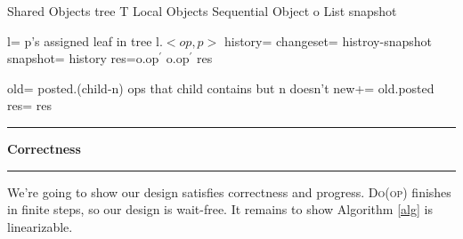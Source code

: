 \documentclass[10pt]{article}
\newcommand\question[1]{\vspace{1.2em}\hrule\textbf{ #1}\vspace{.5em}\hrule}
\newtheorem{lemma}[theorem]{Lemma}
\theoremstyle{definition}
\begin{document}
\begin{algorithm}
\caption{}\label{alg}
\begin{algorithmic}[1]
\begin{multicols}{2}

\Statex Shared Objects
\Statex \hspace{\algorithmicindent}tree T
\Statex Local Objects
\Statex \hspace{\algorithmicindent}Sequential Object o
\Statex \hspace{\algorithmicindent}List snapshot
\Statex

\State l= p's assigned leaf in tree
\State l.$<op, p>$
\State {}
\State history= 
\State changeset= histroy-snapshot
\State snapshot= history
\State res=o.op$^\prime$
\Else
\State o.op$^\prime$
\EndIf
\EndFor
\State \Return res
\EndFunction

\Statex

 \Return
{}
\State {} \EndIf
\State {}
\EndFunction

\Statex

\State old= 
\State posted.(child-n)
\Statex \Comment ops that child contains but n doesn't
\EndFor
\State new+= old.posted
\State res=
\State \Return res
\Statex{}
\EndFunction
\end{multicols}
\end{algorithmic}
\end{algorithm}


\question{Correctness}
We're going to show our design satisfies correctness and progress.
\textsc{Do(\textnormal{op})} finishes in finite steps, so our design is wait-free. It remains to show Algorithm \ref{alg} is linearizable.  


\end{document}
